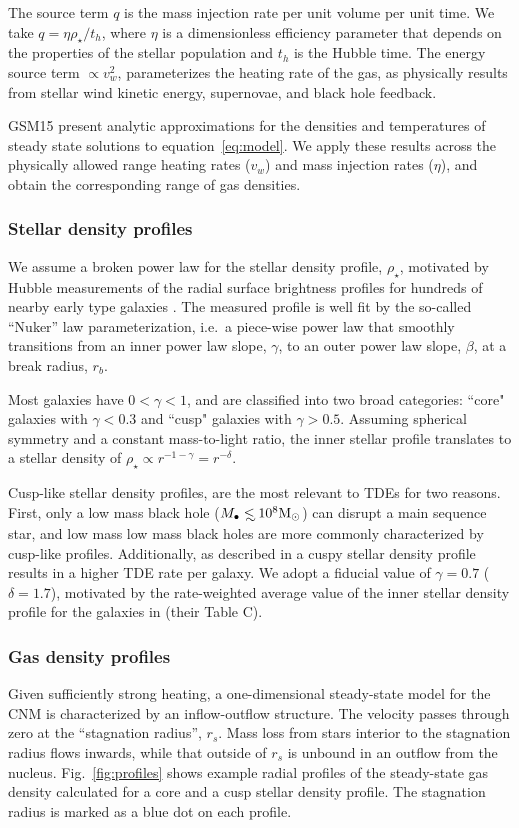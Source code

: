 \documentclass[usenatbib,fleqn]{mnras}
\newcommand\lsim{\mathrel{\rlap{\lower4pt\hbox{\hskip1pt$\sim$}}
    \raise1pt\hbox{$<$}}}
\newcommand{\Mbh}[1][]{M_{\bullet#1}}
\newcommand{\Msun}{{\rm M_\odot}}
\newcommand{\rs}{r_s}
\begin{document}
The source term $q$ is the mass injection rate per unit volume per
unit time. We take $q=\eta \rho_{\star}/t_h$, where $\eta$ is a
dimensionless efficiency parameter that depends on the properties of
the stellar population and $t_h$ is the Hubble time. The energy source
term $\propto v_w^{2}$, parameterizes the heating rate of the gas, as
physically results from stellar wind kinetic energy, supernovae, and
black hole feedback.

GSM15 present analytic approximations for the
densities and temperatures of steady state solutions to
equation~\eqref{eq:model}. We apply these results across the
physically allowed range heating rates ($v_w$) and mass injection
rates ($\eta$), and obtain the corresponding range of gas densities.

\subsubsection{Stellar density profiles}
We assume a broken power law for the stellar density profile,
$\rho_{\star}$, motivated by Hubble measurements of the radial surface
brightness profiles for hundreds of nearby early type galaxies
\citep{Lauer+2007}.  The measured profile is well fit by the so-called
``Nuker'' law parameterization, i.e.~a piece-wise power law that smoothly
transitions from an inner power law slope, $\gamma$, to an outer power
law slope, $\beta$, at a break radius, $r_b$.

Most galaxies have $0<\gamma<1$, and are classified into two broad
categories: ``core" galaxies with $\gamma<0.3$ and ``cusp" galaxies with
$\gamma>0.5$. Assuming spherical symmetry and a constant mass-to-light
ratio, the inner stellar profile translates to a stellar density of
$\rho_\star\propto r^{-1-\gamma}=r^{-\delta}$. 

Cusp-like stellar density profiles, are the most relevant to TDEs for
two reasons.  First, only a low mass black hole ($\Mbh\lsim 10^8
\Msun$) can disrupt a main sequence star, and low mass low mass black
holes are more commonly characterized by cusp-like profiles.
Additionally, as described in \citet{Stone&Metzger2016} a cuspy
stellar density profile results in a higher TDE rate per galaxy.  We
adopt a fiducial value of $\gamma=0.7$ ($\delta=1.7$), motivated by
the rate-weighted average value of the inner stellar density profile
for the galaxies in \citet{Stone&Metzger2016} (their Table C).


\subsubsection{Gas density profiles}
Given sufficiently strong heating, a one-dimensional steady-state
model for the CNM is characterized by an inflow-outflow structure.
The velocity passes through zero at the ``stagnation radius'', $\rs$.
Mass loss from stars interior to the stagnation radius flows inwards,
while that outside of $\rs$ is unbound in an outflow from the nucleus.
Fig.~\ref{fig:profiles} shows example radial profiles of the
steady-state gas density calculated for a core and a cusp stellar
density profile. The stagnation radius is marked as a blue dot on each
profile.
\end{document}
